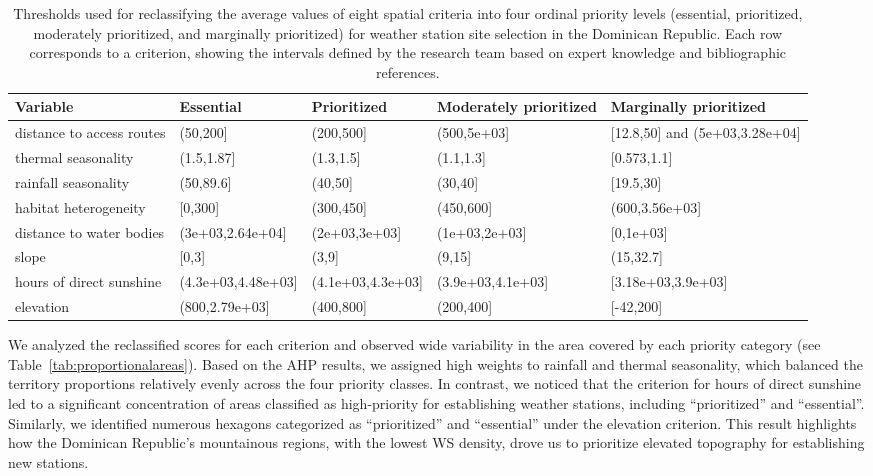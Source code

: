 \documentclass[spanish]{article}
\begin{document}
\begin{table}

\caption{\label{tab:puntuaciones_umbrales_eng}Thresholds used for reclassifying the average values of eight spatial criteria into four ordinal priority levels (essential, prioritized, moderately prioritized, and marginally prioritized) for weather station site selection in the Dominican Republic. Each row corresponds to a criterion, showing the intervals defined by the research team based on expert knowledge and bibliographic references.}
\centering
\begin{tabu} to 
\toprule
\textbf{Variable} & \textbf{Essential} & \textbf{Prioritized} & \textbf{Moderately prioritized} & \textbf{Marginally prioritized}\\
\midrule
distance to access routes & (50,200] & (200,500] & (500,5e+03] & {}[12.8,50] and (5e+03,3.28e+04]\\
thermal seasonality & (1.5,1.87] & (1.3,1.5] & (1.1,1.3] & {}[0.573,1.1]\\
rainfall seasonality & (50,89.6] & (40,50] & (30,40] & {}[19.5,30]\\
habitat heterogeneity & {}[0,300] & (300,450] & (450,600] & (600,3.56e+03]\\
distance to water bodies & (3e+03,2.64e+04] & (2e+03,3e+03] & (1e+03,2e+03] & {}[0,1e+03]\\
\addlinespace
slope & {}[0,3] & (3,9] & (9,15] & (15,32.7]\\
hours of direct sunshine & (4.3e+03,4.48e+03] & (4.1e+03,4.3e+03] & (3.9e+03,4.1e+03] & {}[3.18e+03,3.9e+03]\\
elevation & (800,2.79e+03] & (400,800] & (200,400] & {}[-42,200]\\
\bottomrule
\end{tabu}
\end{table}

We analyzed the reclassified scores for each criterion and observed wide
variability in the area covered by each priority category (see
Table~\ref{tab:proportionalareas}). Based on the AHP results, we
assigned high weights to rainfall and thermal seasonality, which
balanced the territory proportions relatively evenly across the four
priority classes. In contrast, we noticed that the criterion for hours
of direct sunshine led to a significant concentration of areas
classified as high-priority for establishing weather stations, including
``prioritized'' and ``essential''. Similarly, we identified numerous
hexagons categorized as ``prioritized'' and ``essential'' under the
elevation criterion. This result highlights how the Dominican Republic's
mountainous regions, with the lowest WS density, drove us to prioritize
elevated topography for establishing new stations.
\end{document}
